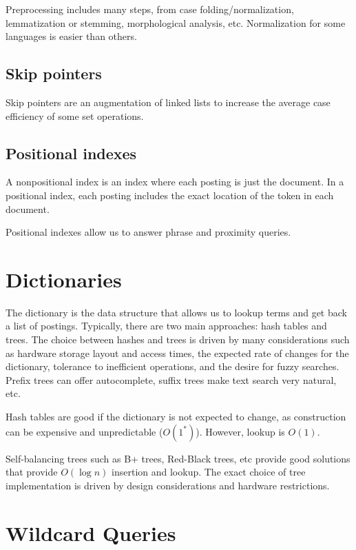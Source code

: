 \documentclass{idc_msc}
\begin{document}
Preprocessing includes many steps, from case folding/normalization, lemmatization or stemming, morphological analysis, etc.
Normalization for some languages is easier than others.

\subsection{Skip pointers}

Skip pointers are an augmentation of linked lists to increase the average case efficiency of some set operations.

\subsection{Positional indexes}

A nonpositional index is an index where each posting is just the document.
In a positional index, each posting includes the exact location of the token in each document.

Positional indexes allow us to answer phrase and proximity queries.

\section{Dictionaries}

The dictionary is the data structure that allows us to lookup terms and get back a list of postings.
Typically, there are two main approaches: hash tables and trees.
The choice between hashes and trees is driven by many considerations such as hardware storage layout and access times, the expected rate of changes for the dictionary, tolerance to inefficient operations, and the desire for fuzzy searches.
Prefix trees can offer autocomplete, suffix trees make text search very natural, etc.

Hash tables are good if the dictionary is not expected to change, as construction can be expensive and unpredictable (\(O(1^*)\)).
However, lookup is \(O(1)\).

Self-balancing trees such as B+ trees, Red-Black trees, etc provide good solutions that provide \(O(\log n)\) insertion and lookup.
The exact choice of tree implementation is driven by design considerations and hardware restrictions.

\section{Wildcard Queries}
\end{document}

